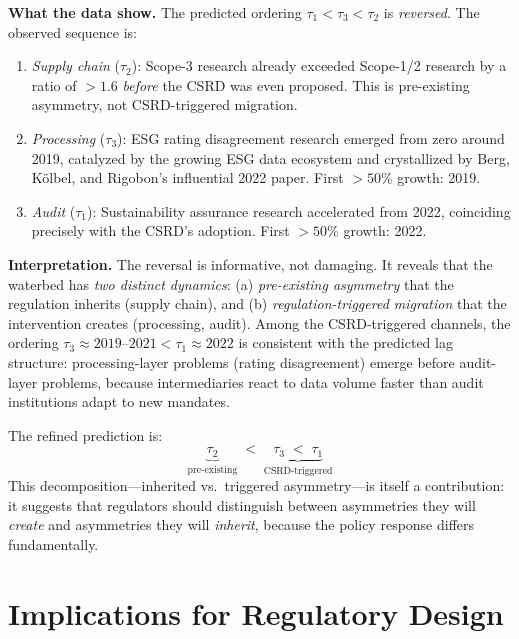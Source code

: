 \documentclass[12pt,a4paper]{article}
\begin{document}
\textbf{What the data show.} The predicted ordering $\tau_1 < \tau_3 < \tau_2$ is \textit{reversed}. The observed sequence is:
\begin{enumerate}[nosep]
\item \textit{Supply chain} ($\tau_2$): Scope-3 research already exceeded Scope-1/2 research by a ratio of $>1.6$ \textit{before} the CSRD was even proposed. This is pre-existing asymmetry, not CSRD-triggered migration.
\item \textit{Processing} ($\tau_3$): ESG rating disagreement research emerged from zero around 2019, catalyzed by the growing ESG data ecosystem and crystallized by Berg, K\"olbel, and Rigobon's influential 2022 paper. First $>50\%$ growth: 2019.
\item \textit{Audit} ($\tau_1$): Sustainability assurance research accelerated from 2022, coinciding precisely with the CSRD's adoption. First $>50\%$ growth: 2022.
\end{enumerate}

\textbf{Interpretation.} The reversal is informative, not damaging. It reveals that the waterbed has \textit{two distinct dynamics}: (a) \textit{pre-existing asymmetry} that the regulation inherits (supply chain), and (b) \textit{regulation-triggered migration} that the intervention creates (processing, audit). Among the CSRD-triggered channels, the ordering $\tau_3 \approx 2019\text{--}2021 < \tau_1 \approx 2022$ is consistent with the predicted lag structure: processing-layer problems (rating disagreement) emerge before audit-layer problems, because intermediaries react to data volume faster than audit institutions adapt to new mandates.

The refined prediction is:
\begin{equation}
\underbrace{\tau_2}_{\text{pre-existing}} \;<\; \underbrace{\tau_3 \;<\; \tau_1}_{\text{CSRD-triggered}}
\end{equation}
This decomposition---inherited vs.\ triggered asymmetry---is itself a contribution: it suggests that regulators should distinguish between asymmetries they will \textit{create} and asymmetries they will \textit{inherit}, because the policy response differs fundamentally.


\section{Implications for Regulatory Design}
\label{sec:implications}
\end{document}
